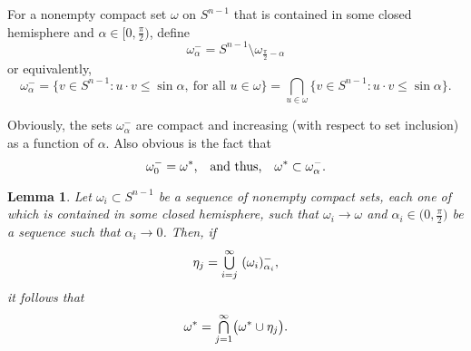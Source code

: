 \documentclass{cpamart1}     %
\newtheorem{lemm}[theo]{Lemma}
\theoremstyle{definition}
\theoremstyle{remark}
\newcommand*{\medcup}{\mathsmaller{\bigcup}}%
\newcommand*{\medcap}{\mathsmaller{\bigcap}}%
\newcommand{\sn}{S^{n-1}}
\begin{document}


For a nonempty compact set $\omega$ on $\sn$ that is contained in some closed hemisphere and $\alpha \in \big[0, \frac\pi2\big)$,
define
\begin{equation}\label{s6}
\omega_\alpha^- = \sn \setminus \omega_{\frac\pi2-\alpha}
\end{equation}
or equivalently,
\begin{equation*}
\omega_\alpha^-
=\{v\in\sn : u\cdot v \le \sin \alpha, \ \text{for all } u\in \omega\}
=\bigcap_{u\in \omega} \{v\in\sn : u\cdot v \le \sin \alpha \}.
\end{equation*}


Obviously, the sets $\omega_\alpha^-$ are compact and increasing
(with respect to set inclusion) as a function of $\alpha$. Also obvious is the fact that
\begin{equation} \label{s6.2}
\text{$\omega_0^- = \omega^*$,\quad and thus,\quad   $\omega^*\subset \omega_\alpha^-$}.
\end{equation}



\begin{lemm}\label{s7}
Let $\omega_i\subset\sn$ be a sequence of nonempty compact sets, each one of which is contained in some closed hemisphere, such that
$\omega_i \to \omega$ and
$\alpha_i \in \big(0, \frac\pi2\big)$ be a sequence such that $\alpha_i \to 0$.
Then, if
\begin{equation*}
\eta_j = \medcup\limits_{i=j}^\infty \,\, (\omega_i)_{\alpha_i}^-,
\end{equation*}
it follows that
\begin{equation*}
\omega^* = \medcap\limits_{j=1}^\infty\big(\omega^* \cup \eta_j\big).
\end{equation*}
\end{lemm}
\end{document}
